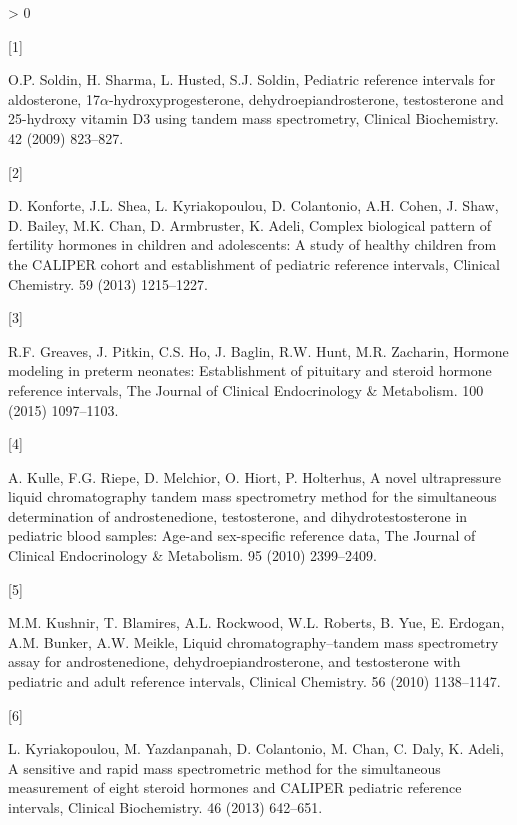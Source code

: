 \documentclass[]{elsarticle} %
\newlength{\csllabelwidth}
\newlength{\cslhangindent}
\newenvironment{CSLReferences}[3] %
 {%
  \setlength{\parindent}{0pt}
  \ifodd #1 \everypar{\setlength{\hangindent}{\cslhangindent}}\ignorespaces\fi
  \ifnum #2 > 0
  \setlength{\parskip}{#2\baselineskip}
  \fi
 }%
 {}
\newcommand{\CSLLeftMargin}[1]{\parbox[t]{\csllabelwidth}{#1}}
\newcommand{\CSLRightInline}[1]{\parbox[t]{\linewidth - \csllabelwidth}{#1}}
\begin{document}
\hypertarget{refs}{}
\begin{CSLReferences}{0}{0}
\leavevmode\hypertarget{ref-soldin2009pediatric}{}%
\CSLLeftMargin{{[}1{]} }
\CSLRightInline{O.P. Soldin, H. Sharma, L. Husted, S.J. Soldin,
Pediatric reference intervals for aldosterone,
17\(\alpha\)-hydroxyprogesterone, dehydroepiandrosterone, testosterone
and 25-hydroxy vitamin D3 using tandem mass spectrometry, Clinical
Biochemistry. 42 (2009) 823--827.}

\leavevmode\hypertarget{ref-konforte2013complex}{}%
\CSLLeftMargin{{[}2{]} }
\CSLRightInline{D. Konforte, J.L. Shea, L. Kyriakopoulou, D. Colantonio,
A.H. Cohen, J. Shaw, D. Bailey, M.K. Chan, D. Armbruster, K. Adeli,
Complex biological pattern of fertility hormones in children and
adolescents: A study of healthy children from the CALIPER cohort and
establishment of pediatric reference intervals, Clinical Chemistry. 59
(2013) 1215--1227.}

\leavevmode\hypertarget{ref-greaves2015hormone}{}%
\CSLLeftMargin{{[}3{]} }
\CSLRightInline{R.F. Greaves, J. Pitkin, C.S. Ho, J. Baglin, R.W. Hunt,
M.R. Zacharin, Hormone modeling in preterm neonates: Establishment of
pituitary and steroid hormone reference intervals, The Journal of
Clinical Endocrinology \& Metabolism. 100 (2015) 1097--1103.}

\leavevmode\hypertarget{ref-kulle2010novel}{}%
\CSLLeftMargin{{[}4{]} }
\CSLRightInline{A. Kulle, F.G. Riepe, D. Melchior, O. Hiort, P.
Holterhus, A novel ultrapressure liquid chromatography tandem mass
spectrometry method for the simultaneous determination of
androstenedione, testosterone, and dihydrotestosterone in pediatric
blood samples: Age-and sex-specific reference data, The Journal of
Clinical Endocrinology \& Metabolism. 95 (2010) 2399--2409.}

\leavevmode\hypertarget{ref-kushnir2010liquid}{}%
\CSLLeftMargin{{[}5{]} }
\CSLRightInline{M.M. Kushnir, T. Blamires, A.L. Rockwood, W.L. Roberts,
B. Yue, E. Erdogan, A.M. Bunker, A.W. Meikle, Liquid
chromatography--tandem mass spectrometry assay for androstenedione,
dehydroepiandrosterone, and testosterone with pediatric and adult
reference intervals, Clinical Chemistry. 56 (2010) 1138--1147.}

\leavevmode\hypertarget{ref-kyriakopoulou2013sensitive}{}%
\CSLLeftMargin{{[}6{]} }
\CSLRightInline{L. Kyriakopoulou, M. Yazdanpanah, D. Colantonio, M.
Chan, C. Daly, K. Adeli, A sensitive and rapid mass spectrometric method
for the simultaneous measurement of eight steroid hormones and CALIPER
pediatric reference intervals, Clinical Biochemistry. 46 (2013)
642--651.}


\end{CSLReferences}
\end{document}
